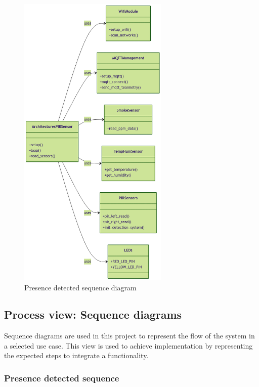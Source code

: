 \begin{figure}[H]
    \centering
    \includegraphics[width=0.64\textwidth]{./images/6/ClassPIRSensor.png}
    \caption{Presence detected sequence diagram}
\end{figure}

\subsection{Process view: Sequence diagrams}

Sequence diagrams are used in this project to represent the flow of the system in a selected use case. This view is used 
to achieve implementation by representing the expected steps to integrate a functionality.

\subsubsection*{Presence detected sequence}

